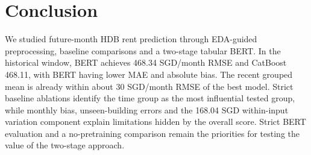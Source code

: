 \section{Conclusion}\label{sec:conclusion}
We studied future-month HDB rent prediction through EDA-guided preprocessing, baseline comparisons and a two-stage tabular BERT.  In the historical window, BERT achieves 468.34 SGD/month RMSE and CatBoost 468.11, with BERT having lower MAE and absolute bias.  The recent grouped mean is already within about 30 SGD/month RMSE of the best model.  Strict baseline ablations identify the time group as the most influential tested group, while monthly bias, unseen-building errors and the 168.04 SGD within-input variation component explain limitations hidden by the overall score.  Strict BERT evaluation and a no-pretraining comparison remain the priorities for testing the value of the two-stage approach.
